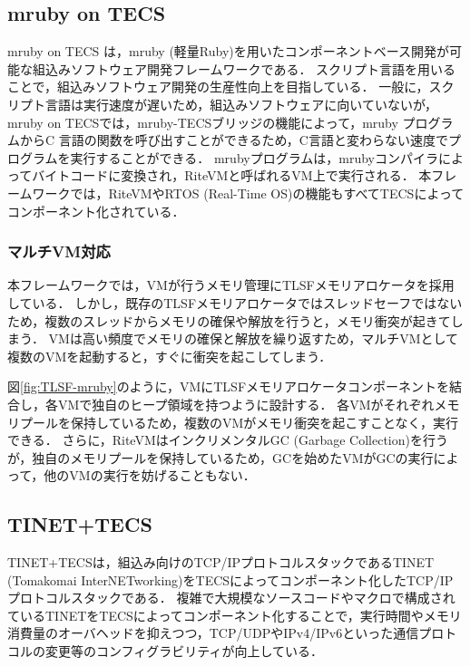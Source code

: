 \documentclass[submit]{ipsj_v2/UTF8/ipsj}
\begin{document}
\subsection{mruby on TECS}
\label{sec:mrubyonTECS}

mruby on TECS は，mruby (軽量Ruby)を用いたコンポーネントベース開発が可能な組込みソフトウェア開発フレームワークである．
スクリプト言語を用いることで，組込みソフトウェア開発の生産性向上を目指している．
一般に，スクリプト言語は実行速度が遅いため，組込みソフトウェアに向いていないが，mruby on TECSでは，mruby-TECSブリッジの機能によって，mruby プログラムからC 言語の関数を呼び出すことができるため，C言語と変わらない速度でプログラムを実行することができる．
mrubyプログラムは，mrubyコンパイラによってバイトコードに変換され，RiteVMと呼ばれるVM上で実行される．
本フレームワークでは，RiteVMやRTOS (Real-Time OS)の機能もすべてTECSによってコンポーネント化されている．


\subsubsection{マルチVM対応}

本フレームワークでは，VMが行うメモリ管理にTLSFメモリアロケータを採用している．
しかし，既存のTLSFメモリアロケータではスレッドセーフではないため，複数のスレッドからメモリの確保や解放を行うと，メモリ衝突が起きてしまう．
VMは高い頻度でメモリの確保と解放を繰り返すため，マルチVMとして複数のVMを起動すると，すぐに衝突を起こしてしまう．

図\ref{fig:TLSF-mruby}のように，VMにTLSFメモリアロケータコンポーネントを結合し，各VMで独自のヒープ領域を持つように設計する．
各VMがそれぞれメモリプールを保持しているため，複数のVMがメモリ衝突を起こすことなく，実行できる．
さらに，RiteVMはインクリメンタルGC (Garbage Collection)を行うが，独自のメモリプールを保持しているため，GCを始めたVMがGCの実行によって，他のVMの実行を妨げることもない．
    
\subsection{TINET+TECS}
\label{sec:TINET+TECS}

TINET+TECSは，組込み向けのTCP/IPプロトコルスタックであるTINET (Tomakomai InterNETworking)をTECSによってコンポーネント化したTCP/IPプロトコルスタックである．
複雑で大規模なソースコードやマクロで構成されているTINETをTECSによってコンポーネント化することで，実行時間やメモリ消費量のオーバヘッドを抑えつつ，TCP/UDPやIPv4/IPv6といった通信プロトコルの変更等のコンフィグラビリティが向上している．
\end{document}
